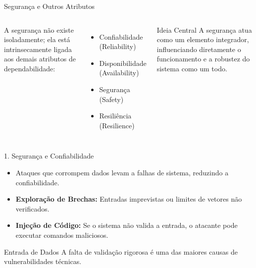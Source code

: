 \documentclass[aspectratio=169]{beamer}
\begin{document}
\begin{frame}{Segurança e Outros Atributos}

\begin{columns}

    A segurança não existe isoladamente; ela está intrinsecamente ligada aos demais atributos de dependabilidade:
    
    \vspace{0.3cm}
    
    \begin{itemize}
        \item Confiabilidade (Reliability)
        \item Disponibilidade (Availability)
        \item Segurança (Safety)
        \item Resiliência (Resilience)
    \end{itemize}

    \vspace{0.3cm}
    
    \begin{block}{Ideia Central}
        A segurança atua como um elemento integrador, influenciando diretamente o funcionamento e a robustez do sistema como um todo.
    \end{block}

    \centering

\end{columns}

\end{frame}

\begin{frame}{1. Segurança e Confiabilidade}
    \begin{itemize}
        \item Ataques que corrompem dados levam a falhas de sistema, reduzindo a confiabilidade.
        \item \textbf{Exploração de Brechas:} Entradas imprevistas ou limites de vetores não verificados.
        \item \textbf{Injeção de Código:} Se o sistema não valida a entrada, o atacante pode executar comandos maliciosos.
    \end{itemize}
    \begin{block}{Entrada de Dados}
        A falta de validação rigorosa é uma das maiores causas de vulnerabilidades técnicas.
    \end{block}
\end{frame}
\end{document}
